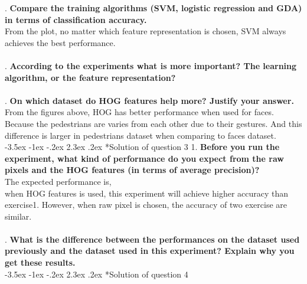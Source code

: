 \documentclass[12pt]{article}
\makeatletter
\renewcommand\section{\@startsection {section}{1}{\z@}%
	{-3.5ex \@plus -1ex \@minus -.2ex}%
	{2.3ex \@plus.2ex}%
	{\normalfont\large\bfseries}}%
\makeatother
\begin{document}
	. \textbf{Compare the training algorithms (SVM, logistic regression and GDA) in terms of classification accuracy.}\\
	From the plot, no matter which feature representation is chosen, SVM always achieves the best performance.\\
	\\
	. \textbf{According to the experiments what is more important? The learning algorithm, or the feature representation?}\\
	\\
	. \textbf{On which dataset do HOG features help more? Justify your answer.}\\
	From the figures above, HOG has better performance when used for faces.\\
	Because the pedestrians are varies from each other due to their gestures. And this difference is larger in pedestrians dataset when comparing to faces dataset.\\

	\section*{Solution of question 3}
	1. \textbf{Before you run the experiment, what kind of performance do you expect from the raw pixels and the HOG features (in terms of average precision)?}\\
	The expected performance is, \\
	when HOG features is used, this experiment will achieve higher accuracy than exercise1. However, when raw pixel is chosen, the accuracy of two exercise are similar.\\
	\\
	. \textbf{What is the difference between the performances on the dataset used previously and the dataset used in this experiment? Explain why you get these results.}\\
	 

	\section*{Solution of question 4}
	
	
\end{document}
